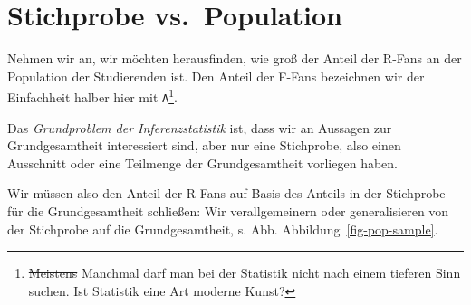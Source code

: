 \documentclass[
  a4paper,
  DIV=11]{scrreprt}
\theoremstyle{definition}
\theoremstyle{remark}
\begin{document}
\hypertarget{stichprobe-vs.-population}{%
\section{Stichprobe vs.~Population}\label{stichprobe-vs.-population}}

Nehmen wir an, wir möchten herausfinden, wie groß der Anteil der R-Fans
an der Population der Studierenden ist. Den Anteil der F-Fans bezeichnen
wir der Einfachheit halber hier mit \texttt{A}\footnote{\sout{Meistens}
  Manchmal darf man bei der Statistik nicht nach einem tieferen Sinn
  suchen. Ist Statistik eine Art moderne Kunst?}.

Das \emph{Grundproblem der Inferenzstatistik} ist, dass wir an Aussagen
zur Grundgesamtheit interessiert sind, aber nur eine Stichprobe, also
einen Ausschnitt oder eine Teilmenge der Grundgesamtheit vorliegen
haben.

Wir müssen also den Anteil der R-Fans auf Basis des Anteils in der
Stichprobe für die Grundgesamtheit schließen: Wir verallgemeinern oder
generalisieren von der Stichprobe auf die Grundgesamtheit, s. Abb.
Abbildung~\ref{fig-pop-sample}.
\end{document}
